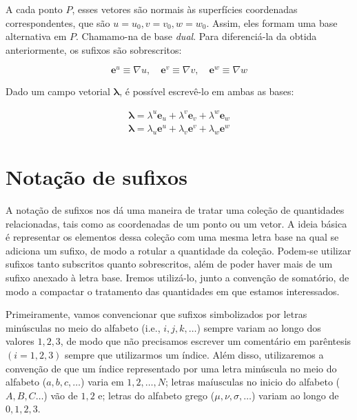 A cada ponto $ P $, esses vetores são normais às superfícies coordenadas correspondentes, que são $ u=u_0, v=v_0, w=w_0 $. Assim, eles formam uma base alternativa em $ P $. Chamamo-na de base \textit{dual}. Para diferenciá-la da obtida anteriormente, os sufixos são sobrescritos:

\begin{equation}\label{eq:VetoresDuaisU}
\boxed{\mathbf{e}^{u} \equiv \nabla u, \quad \mathbf{e}^{v} \equiv \nabla v, \quad \mathbf{e}^{w} \equiv \nabla w}
\end{equation} 

Dado um campo vetorial $ \mathbf{\lambda} $, é possível escrevê-lo em ambas as bases:

\begin{equation}\label{eq:LambdaEmAmbasAsBases}
\begin{array}{l}{\boldsymbol{\lambda}=\lambda^{u} \mathbf{e}_{u}+\lambda^{v} \mathbf{e}_{v}+\lambda^{w} \mathbf{e}_{w}} \\ {\boldsymbol{\lambda}=\lambda_{u} \mathbf{e}^{u}+\lambda_{v} \mathbf{e}^{v}+\lambda_{w} \mathbf{e}^{w}}\end{array}
\end{equation}

\section{Notação de sufixos}\label{sec:NotacaoSufixo}
A notação de sufixos nos dá uma maneira de tratar uma coleção de quantidades relacionadas, tais como as coordenadas de um ponto ou um vetor. A ideia básica é representar os elementos dessa coleção com uma mesma letra base na qual se adiciona um sufixo, de modo a rotular a quantidade da coleção. Podem-se utilizar sufixos tanto subscritos quanto sobrescritos, além de poder haver mais de um sufixo anexado à letra base. Iremos utilizá-lo, junto a convenção de somatório, de modo a compactar o tratamento das quantidades em que estamos interessados.

Primeiramente, vamos convencionar que sufixos simbolizados por letras minúsculas no meio do alfabeto (i.e., $i, j, k, \ldots$) sempre variam ao longo dos valores $1, 2, 3$, de modo que não precisamos escrever um comentário em parêntesis $(i=1,2,3)$ sempre que utilizarmos um índice. Além disso, utilizaremos a convenção de que um índice representado por uma letra minúscula no meio do alfabeto ($a,b,c,\ldots$) varia em $1,2,\ldots,N$; letras maíusculas no inicio do alfabeto ($A,B,C\ldots$) vão de $1,2$ e; letras do alfabeto grego ($\mu,\nu,\sigma,\ldots$) variam ao longo de $0,1,2,3$.

